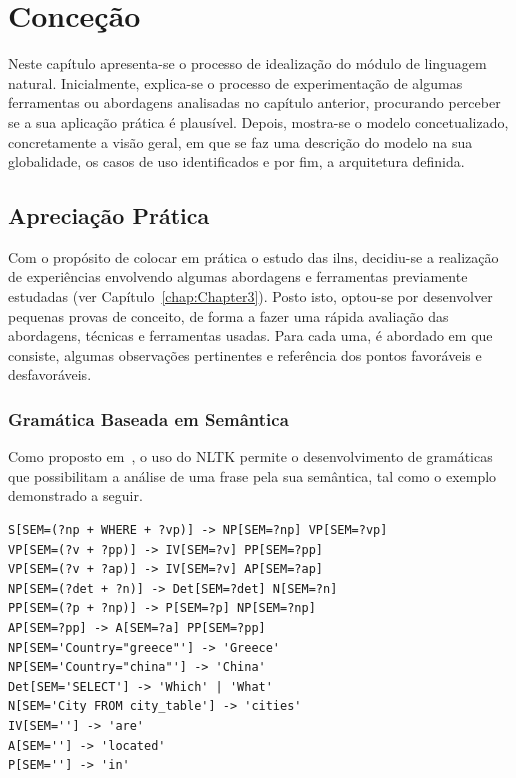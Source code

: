 \chapter{Conceção}
\label{chap:Chapter4}
Neste capítulo apresenta-se o processo de idealização do módulo de linguagem natural. Inicialmente, explica-se o processo de experimentação de algumas ferramentas ou abordagens analisadas no capítulo anterior, procurando perceber se a sua aplicação prática é plausível. Depois, mostra-se o modelo concetualizado, concretamente a visão geral, em que se faz uma descrição do modelo na sua globalidade, os casos de uso identificados e por fim, a arquitetura definida.

\section{Apreciação Prática}
\label{sec:chap04_approaches}
Com o propósito de colocar em prática o estudo das \glspl{iln}, decidiu-se a realização de experiências envolvendo algumas abordagens e ferramentas previamente estudadas (ver Capítulo~\ref{chap:Chapter3}). Posto isto, optou-se por desenvolver pequenas provas de conceito, de forma a fazer uma rápida avaliação das abordagens, técnicas e ferramentas usadas. Para cada uma, é abordado em que consiste, algumas observações pertinentes e referência dos pontos favoráveis e desfavoráveis.

\subsection{Gramática Baseada em Semântica}
Como proposto em~\textcite[p.~361-403]{natural_language_processing_with_python}, o uso do NLTK permite o desenvolvimento de gramáticas que possibilitam a análise de uma frase pela sua semântica, tal como o exemplo demonstrado a seguir.

\begin{lstlisting}[language={},caption={Excerto de uma gramática, extraído de~\textcite{natural_language_processing_with_python}},numbers=none,label=lst:grammarexample,basicstyle=\scriptsize]
S[SEM=(?np + WHERE + ?vp)] -> NP[SEM=?np] VP[SEM=?vp]
VP[SEM=(?v + ?pp)] -> IV[SEM=?v] PP[SEM=?pp]
VP[SEM=(?v + ?ap)] -> IV[SEM=?v] AP[SEM=?ap]
NP[SEM=(?det + ?n)] -> Det[SEM=?det] N[SEM=?n]
PP[SEM=(?p + ?np)] -> P[SEM=?p] NP[SEM=?np]
AP[SEM=?pp] -> A[SEM=?a] PP[SEM=?pp]
NP[SEM='Country="greece"'] -> 'Greece'
NP[SEM='Country="china"'] -> 'China'
Det[SEM='SELECT'] -> 'Which' | 'What'
N[SEM='City FROM city_table'] -> 'cities'
IV[SEM=''] -> 'are'
A[SEM=''] -> 'located'
P[SEM=''] -> 'in'
\end{lstlisting}

